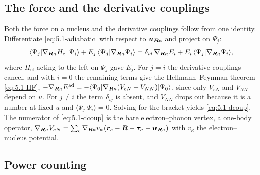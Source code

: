 \subsection*{The force and the derivative couplings}

Both the force on a nucleus and the derivative couplings follow from one identity. Differentiate \cref{eq:5.1-adiabatic} with respect to $\bm{u}_{\bm{R}\kappa}$ and project on $\Psi_j$:
\begin{equation*}
  \langle\Psi_j|\nabla_{\bm{R}\kappa}H_{\mathrm{el}}|\Psi_i\rangle + E_j\,\langle\Psi_j|\nabla_{\bm{R}\kappa}\Psi_i\rangle = \delta_{ij}\,\nabla_{\bm{R}\kappa}E_i + E_i\,\langle\Psi_j|\nabla_{\bm{R}\kappa}\Psi_i\rangle ,
\end{equation*}
where $H_{\mathrm{el}}$ acting to the left on $\Psi_j$ gave $E_j$. For $j = i$ the derivative couplings cancel, and with $i = 0$ the remaining terms give the Hellmann--Feynman theorem \cref{eq:5.1-HF}, $-\nabla_{\bm{R}\kappa}E^{\mathrm{ad}} = -\langle\Psi_0|\nabla_{\bm{R}\kappa}(V_{eN} + V_{NN})|\Psi_0\rangle$, since only $V_{eN}$ and $V_{NN}$ depend on $u$. For $j \ne i$ the term $\delta_{ij}$ is absent, and $V_{NN}$ drops out because it is a number at fixed $u$ and $\langle\Psi_j|\Psi_i\rangle = 0$. Solving for the bracket yields \cref{eq:5.1-dcoup}. The numerator of \cref{eq:5.1-dcoup} is the bare electron--phonon vertex, a one-body operator, $\nabla_{\bm{R}\kappa}V_{eN} = \sum_e\nabla_{\bm{R}\kappa}v_\kappa(\bm{r}_e - \bm{R} - \bm{\tau}_\kappa - \bm{u}_{\bm{R}\kappa})$ with $v_\kappa$ the electron--nucleus potential.

\subsection*{Power counting}

